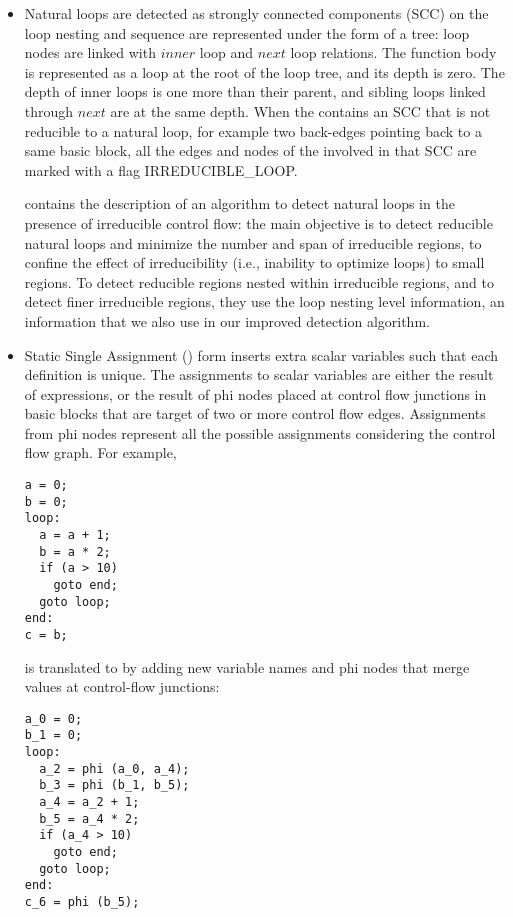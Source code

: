 \documentclass{sig-alternate}
\begin{document}
\begin{itemize}
\label{subsec:loop-tree}
\item Natural loops \cite{dragonbook, ramalingam} are detected as strongly connected
  components (SCC) \cite{tarjan} on the \CFG{,} loop nesting and sequence are
  represented under the form of a tree: loop nodes are linked with $inner$ loop
  and $next$ loop relations.  The function body is represented as a loop at the
  root of the loop tree, and its depth is zero.  The depth of inner loops is one
  more than their parent, and sibling loops linked through $next$ are at the
  same depth.  When the \CFG{} contains an SCC that is not reducible to a natural
  loop, for example two back-edges pointing back to a same basic block, all the
  edges and nodes of the \CFG{} involved in that SCC are marked with a flag
  IRREDUCIBLE\_LOOP.

  \cite{sreedhar1996identifying} contains the description of an algorithm to
  detect natural loops in the presence of irreducible control flow: the main
  objective is to detect reducible natural loops and minimize the number and
  span of irreducible regions, to confine the effect of irreducibility (i.e.,
  inability to optimize loops) to small regions.  To detect reducible regions
  nested within irreducible regions, and to detect finer irreducible regions,
  they use the loop nesting level information, an information that we also use
  in our improved \SCoP{} detection algorithm.

\item Static Single Assignment (\SSA) form \cite{cytron} inserts extra scalar
  variables such that each definition is unique.  The assignments to scalar
  variables are either the result of expressions, or the result of phi nodes
  placed at control flow junctions in basic blocks that are target of two or
  more control flow edges.  Assignments from phi nodes represent all the
  possible assignments considering the control flow graph.  For example,
  \begin{verbatim}
a = 0;
b = 0;
loop:
  a = a + 1;
  b = a * 2;
  if (a > 10)
    goto end;
  goto loop;
end:
c = b;
  \end{verbatim}
  is translated to \SSA{} by adding new variable names and phi nodes that merge
  values at control-flow junctions:
  \begin{verbatim}
a_0 = 0;
b_1 = 0;
loop:
  a_2 = phi (a_0, a_4);
  b_3 = phi (b_1, b_5);
  a_4 = a_2 + 1;
  b_5 = a_4 * 2;
  if (a_4 > 10)
    goto end;
  goto loop;
end:
c_6 = phi (b_5);
  \end{verbatim}


\end{itemize}
\end{document}
